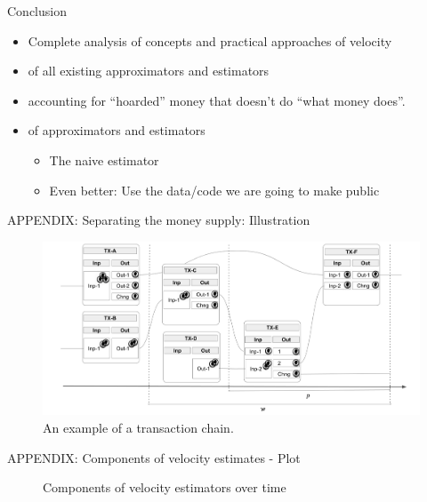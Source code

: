 \documentclass[]{beamer}
\begin{document}

\begin{frame}{Conclusion}

  \begin{itemize}
  \item Complete analysis of concepts and practical approaches of velocity
  \item {} of all existing approximators and estimators
  \item {} accounting for ``hoarded'' money that doesn't do ``what money does''.
  \item {} of approximators and estimators
    \begin{itemize}
    \item {} The naive estimator 
    \item Even better: Use the data/code we are going to make public
    \end{itemize}
  \end{itemize}
  
\end{frame}


\begin{frame}{APPENDIX: Separating the money supply: Illustration}
  \begin{figure}
    \centerline{\includegraphics[scale=0.2]{../text/fig/mcirc_concept_window_uneqal_period_HR}}
    \caption{An example of a transaction chain.}
    \label{fig:mcirc_concept}
  \end{figure}

\end{frame}

\begin{frame}{APPENDIX: Components of velocity estimates - Plot}
  \begin{figure}[h]
    \centering
    \caption{Components of velocity estimators over time}
    \label{fig: Components of velocity estimators over time}
  \end{figure}

\end{frame}
\end{document}
